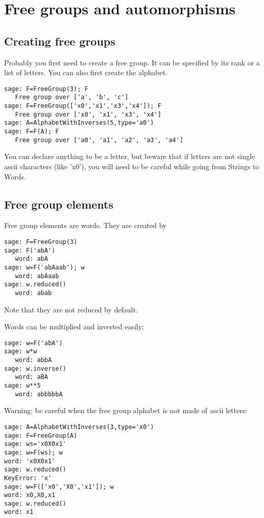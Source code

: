 \documentclass[10pt,a4paper]{article}
\begin{document}
\section{Free groups and automorphisms}

\subsection{Creating free groups}

Probably you first need to create a free group. It can be specified by
its rank or a list of letters. You can also first create the alphabet.
\begin{verbatim}
sage: F=FreeGroup(3); F
   Free group over ['a', 'b', 'c']
sage: F=FreeGroup(['x0','x1','x3','x4']); F
   Free group over ['x0', 'x1', 'x3', 'x4']
sage: A=AlphabetWithInverses(5,type='a0')
sage: F=F(A); F
   Free group over ['a0', 'a1', 'a2', 'a3', 'a4']
\end{verbatim}
You can declare anything to be a letter, but beware that if letters are
not single ascii characters (like 'x0'), you will need to be careful
while going from Strings to Words.

\subsection{Free group elements}

Free group elements are words. They are created by
\begin{verbatim}
sage: F=FreeGroup(3)
sage: F('abA')
   word: abA
sage: w=F('abAaab'); w
   word: abAaab
sage: w.reduced()
   word: abab
\end{verbatim} 
Note that they are not reduced by default. 

Words can be multiplied and inverted easily:

\begin{verbatim}
sage: w=F('abA')
sage: w*w
   word: abbA
sage: w.inverse()
   word: aBA
sage: w**5
   word: abbbbbA
\end{verbatim}

Warning: be careful when the free group alphabet is not made of ascii letters:

\begin{verbatim}
sage: A=AlphabetWithInverses(3,type='x0')
sage: F=FreeGroup(A)
sage: ws='x0X0x1'
sage: w=F(ws); w
word: 'x0X0x1'
sage: w.reduced()
KeyError: 'x'
sage: w=F(['x0','X0','x1']); w
word: x0,X0,x1
sage: w.reduced()
word: x1
\end{verbatim}
\end{document}
